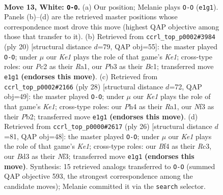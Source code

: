 \documentclass[11pt]{article}
\begin{document}
\clearpage

\begin{figure}[p]\centering
\begin{subfigure}{0.46\textwidth}\centering
\resizebox{\linewidth}{!}{%
\newchessgame
\chessboard[
  setfen={r1bqk2r/5p2/1p2pnp1/p1b4p/5B1P/1P1B1NP1/P1P2P2/R2QK2R w KQkq - 0 13},
  showmover=false,
  pgfstyle=straightmove, color=movearrow, markmove={e1-g1}
]}
\caption{}
\end{subfigure}\hfill
\begin{subfigure}{0.46\textwidth}\centering
\resizebox{\linewidth}{!}{%
\newchessgame
\chessboard[
  setfen={1r2kb1r/1b3ppp/pq2pn2/1p6/2pPP3/2N3P1/PP3PBP/R1BQK2R w KQk - 0 11},
  showmover=false,
  pgfstyle=straightmove, color=movearrow, markmove={e1-g1}
]}
\caption{}
\end{subfigure}
\\[4pt]
\begin{subfigure}{0.46\textwidth}\centering
\resizebox{\linewidth}{!}{%
\newchessgame
\chessboard[
  setfen={r3kb1r/1pqb1ppp/p3p3/n2pP3/5P2/2PBBN2/PP4PP/R1Q1K2R w KQkq - 2 15},
  showmover=false,
  pgfstyle=straightmove, color=movearrow, markmove={e1-g1}
]}
\caption{}
\end{subfigure}\hfill
\begin{subfigure}{0.46\textwidth}\centering
\resizebox{\linewidth}{!}{%
\newchessgame
\chessboard[
  setfen={r1b1r1k1/p2n1pp1/1pp1pq1p/8/2BP4/P1R1PN1P/1P3PP1/3QK2R w K - 0 14},
  showmover=false,
  pgfstyle=straightmove, color=movearrow, markmove={e1-g1}
]}
\caption{}
\end{subfigure}
\caption{\textbf{Move 13, White: \texttt{O-O}.} (a) Our position; Melanie plays \texttt{O-O} (\texttt{e1g1}). Panels (b)--(d) are the retrieved master positions whose correspondence most drove this move (highest QAP objective among those that transfer to it). (b) Retrieved from \texttt{ccrl\_top\_p0002\#3984} (ply 20) [structural distance $d$=79, QAP obj=55]: the master played \texttt{O-O}; under $\mu$ our \emph{Ke1} plays the role of that game's \emph{Ke1}; cross-type roles: our \emph{P}c2 as their \emph{R}a1, our \emph{P}b3 as their \emph{B}c1; transferred move \texttt{e1g1} \textbf{(endorses this move)}. (c) Retrieved from \texttt{ccrl\_top\_p0002\#2166} (ply 28) [structural distance $d$=72, QAP obj=49]: the master played \texttt{O-O}; under $\mu$ our \emph{Ke1} plays the role of that game's \emph{Ke1}; cross-type roles: our \emph{P}h4 as their \emph{R}a1, our \emph{N}f3 as their \emph{P}b2; transferred move \texttt{e1g1} \textbf{(endorses this move)}. (d) Retrieved from \texttt{ccrl\_top\_p0000\#2617} (ply 26) [structural distance $d$=81, QAP obj=48]: the master played \texttt{O-O}; under $\mu$ our \emph{Ke1} plays the role of that game's \emph{Ke1}; cross-type roles: our \emph{B}f4 as their \emph{R}c3, our \emph{B}d3 as their \emph{N}f3; transferred move \texttt{e1g1} \textbf{(endorses this move)}. Synthesis: 15 retrieved analogs transferred to \texttt{O-O} (summed QAP objective 593, the strongest correspondence among the candidate moves); Melanie committed it via the \texttt{search} selector.}
\label{fig:thought-m24}
\end{figure}
\end{document}
